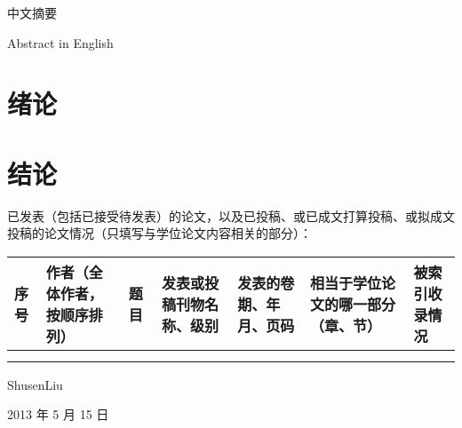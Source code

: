 \documentclass[unicode,bachelor]{scutthesis}
\begin{document}

\begin{abstractCn}
中文摘要
\end{abstractCn}

\begin{abstractEn}
Abstract in English
\end{abstractEn}


\tableofcontents{}
 
\mainmatter

\chapter{绪论}

\chapter{结论}




\backmatter
\pagestyle{appendix_style}


已发表（包括已接受待发表）的论文，以及已投稿、或已成文打算投稿、或拟成文投稿的论文情况（只填写与学位论文内容相关的部分）：

\begin{table}
\begin{longtable}{|>{\centering}m{0.5cm}|>{\centering}m{2.3cm}|>{\centering}m{3.5cm}|>{\centering}m{2.6cm}|>{\centering}m{2cm}|>{\centering}m{1.3cm}|>{\centering}m{0.9cm}|}
\hline 
序号 & 作者（全体作者，按顺序排列） & 题 目 & 发表或投稿刊物名称、级别 & 发表的卷期、年月、页码 & 相当于学位论文的哪一部分（章、节） & 被索引收录情况\tabularnewline
\hline 
 &  &  &  &  &  & \tabularnewline
\hline 
 &  &  &  &  &  & \tabularnewline
\hline 
\end{longtable}
\end{table}


\begin{flushright}
ShusenLiu
\end{flushright}
\vspace{-30pt}
\begin{flushright}
2013 年 5 月 15 日
\end{flushright}%
\end{document}
